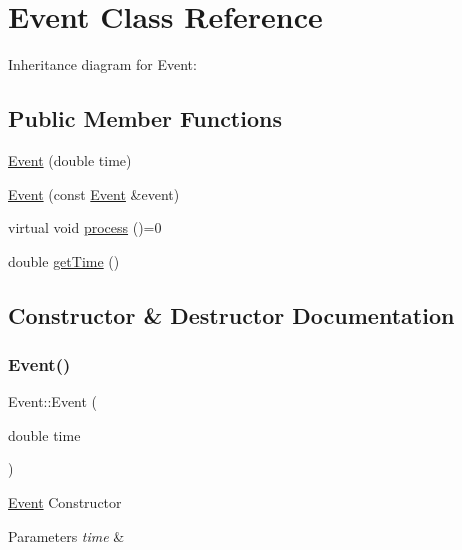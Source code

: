 \hypertarget{classEvent}{}\section{Event Class Reference}
\label{classEvent}


Inheritance diagram for Event\+:
\subsection*{Public Member Functions}
\begin{DoxyCompactItemize}
\item 
\hyperlink{classEvent_aebd4c54256dbf46040053babdfcdf987}{Event} (double time)
\item 
\hyperlink{classEvent_ae8b35bf9237b74824194f87128e4fdab}{Event} (const \hyperlink{classEvent}{Event} \&event)
\item 
virtual void \hyperlink{classEvent_af1940e82c4da67c8119f0dfe026949b4}{process} ()=0
\item 
double \hyperlink{classEvent_ab05b23f7cc8d126efcbf189062f3b275}{get\+Time} ()
\end{DoxyCompactItemize}


\subsection{Constructor \& Destructor Documentation}
\mbox{\label{classEvent_aebd4c54256dbf46040053babdfcdf987}} 
\subsubsection{\texorpdfstring{Event()}{Event()}\hspace{0.1cm}{\footnotesize\ttfamily [1/2]}}
{\footnotesize\ttfamily Event\+::\+Event (\begin{DoxyParamCaption}\item[{double}]{time }\end{DoxyParamCaption})\hspace{0.3cm}{\ttfamily [explicit]}}

\hyperlink{classEvent}{Event} Constructor 
\begin{DoxyParams}{Parameters}
{\em time} & \\
\hline
\end{DoxyParams}
\mbox{\label{classEvent_ae8b35bf9237b74824194f87128e4fdab}} 
